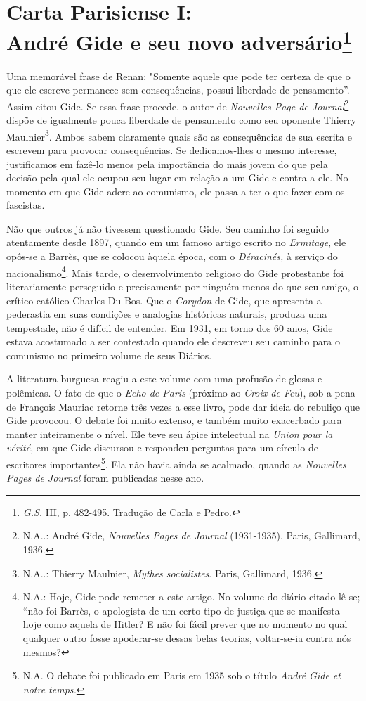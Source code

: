 \chapter{Carta Parisiense I:\\ André Gide e seu novo adversário\footnote[*]{
  \emph{G.S.} III, p. 482-495. Tradução de Carla e Pedro.}}

Uma memorável frase de Renan: "Somente aquele que pode ter certeza de
que o que ele escreve permanece sem consequências, possui liberdade de
pensamento''. Assim citou Gide. Se essa frase procede, o autor de
\emph{Nouvelles Page de Journal}\footnote{N.A..: André Gide,
  \emph{Nouvelles Pages de Journal} (1931-1935). Paris, Gallimard, 1936.}
dispõe de igualmente pouca liberdade de pensamento como seu oponente
Thierry Maulnier\footnote{N.A..: Thierry Maulnier, \emph{Mythes
  socialistes}. Paris, Gallimard, 1936.}. Ambos sabem claramente quais
são as consequências de sua escrita e escrevem para provocar
consequências. Se dedicamos-lhes o mesmo interesse, justificamos em
fazê-lo menos pela importância do mais jovem do que pela decisão pela
qual ele ocupou seu lugar em relação a um Gide e contra a ele. No
momento em que Gide adere ao comunismo, ele passa a ter o que fazer com
os fascistas.

Não que outros já não tivessem questionado Gide. Seu caminho foi seguido
atentamente desde 1897, quando em um famoso artigo escrito no
\emph{Ermitage}, ele opôs-se a Barrès, que se colocou àquela época, com
o \emph{Déracinés,} à serviço do nacionalismo\footnote{N.A.: Hoje, Gide
  pode remeter a este artigo. No volume do diário citado lê-se; ``não
  foi Barrès, o apologista de um certo tipo de justiça que se manifesta
  hoje como aquela de Hitler? E não foi fácil prever que no momento no
  qual qualquer outro fosse apoderar-se dessas belas teorias,
  voltar-se-ia contra nós mesmos?}. Mais tarde, o desenvolvimento
religioso do Gide protestante foi literariamente perseguido e
precisamente por ninguém menos do que seu amigo, o crítico católico
Charles Du Bos. Que o \emph{Corydon} de Gide, que apresenta a pederastia
em suas condições e analogias históricas naturais, produza uma
tempestade, não é difícil de entender. Em 1931, em torno dos 60 anos,
Gide estava acostumado a ser contestado quando ele descreveu seu caminho
para o comunismo no primeiro volume de seus Diários.

A literatura burguesa reagiu a este volume com uma profusão de glosas e
polêmicas. O fato de que o \emph{Echo de Paris} (próximo ao \emph{Croix
de Feu}), sob a pena de François Mauriac retorne três vezes a esse
livro, pode dar ideia do rebuliço que Gide provocou. O debate foi muito
extenso, e também muito exacerbado para manter inteiramente o nível. Ele
teve seu ápice intelectual na \emph{Union pour la vérité}, em que Gide
discursou e respondeu perguntas para um círculo de escritores
importantes\footnote{N.A. O debate foi publicado em Paris em 1935 sob o
  título \emph{André Gide et notre temps.}}. Ela não havia ainda se
acalmado, quando as \emph{Nouvelles Pages de Journal} foram publicadas
nesse ano.

